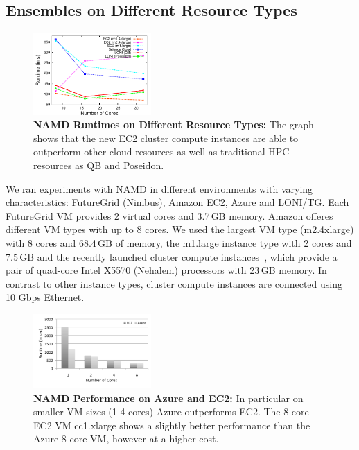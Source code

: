 \documentclass[conference,final]{IEEEtran}
\newcommand{\up}{\vspace*{-1em}}
\begin{document}

\subsection{Ensembles on Different Resource Types}
\up
\label{sec:performance_namd}

\begin{figure}[t]
    \centering
        \includegraphics[width=0.4\textwidth]{performance/namd_run}
    \caption{\textbf{NAMD Runtimes on Different Resource Types: } The
          graph shows that the new EC2 cluster compute instances are 
          able to outperform other cloud resources as well as traditional
          HPC resources as QB and Poseidon.\up}
    \label{fig:performance_namd_run}

\end{figure}


We ran experiments with NAMD in different environments with varying
characteristics: FutureGrid (Nimbus), Amazon EC2, Azure and
LONI/TG.  Each FutureGrid VM provides 2 virtual cores and
3.7\,GB memory.  Amazon offeres different VM types with up to 8
cores. We used the largest VM type (m2.4xlarge) with 8 cores and
68.4\,GB of memory, the m1.large instance type with 2 cores and
7.5\,GB and the recently launched cluster compute
instances~\cite{ec2-cc}, which provide a pair of quad-core Intel X5570
(Nehalem) processors with 23\,GB memory. In contrast to other instance
types, cluster compute instances are connected using 10 Gbps Ethernet.


\begin{figure}[t]
    \centering
        \includegraphics[width=0.4\textwidth]{performance/namd_ec2_azure.pdf}
        \up
        \caption{\textbf{NAMD Performance on Azure and EC2:} In
          particular on smaller VM sizes (1-4 cores) Azure outperforms
          EC2. The 8 core EC2 VM cc1.xlarge shows a slightly better
          performance than the Azure 8 core VM, however at a higher
          cost.} %
    \label{fig:performance_namd_ec2_azure}
    \up\up
\end{figure}
\end{document}
